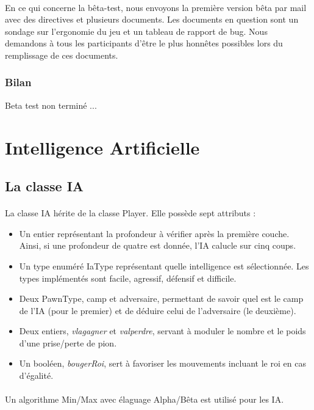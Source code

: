 \documentclass[11pt]{article} %
\begin{document}
\paragraph{}
En ce qui concerne la bêta-test, nous envoyons la première version bêta par mail avec des directives et plusieurs documents. Les documents en question sont un sondage sur l'ergonomie du jeu et un tableau de rapport de bug. Nous demandons à tous les participants d'être le plus honnêtes possibles lors du remplissage de ces documents.

\subsubsection{Bilan}


Beta test non terminé ...

\section{Intelligence Artificielle}

\subsection{La classe IA}
\paragraph{}
La classe IA hérite de la classe Player. Elle possède sept attributs :
\begin{itemize}
\item Un entier représentant la profondeur à vérifier après la première couche. Ainsi, si une profondeur de quatre est donnée, l'IA calucle sur cinq coups.
\item Un type enuméré IaType représentant quelle intelligence est sélectionnée. Les types implémentés sont facile, agressif, défensif et difficile.
\item Deux PawnType, camp et adversaire, permettant de savoir quel est le camp de l'IA (pour le premier) et de déduire celui de l'adversaire (le deuxième).
\item Deux entiers, \textit{vlagagner} et \textit{valperdre}, servant à moduler le nombre et le poids d'une prise/perte de pion.
\item Un booléen, \textit{bougerRoi}, sert à favoriser les mouvements incluant le roi en cas d'égalité.
\end{itemize}
\paragraph{}
Un algorithme Min/Max avec élaguage Alpha/Bêta est utilisé pour les IA.
\end{document}
